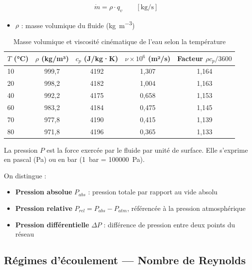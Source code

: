 \begin{definition}[title=Débit massique]
\begin{equation}
  \dot{m} = \rho \cdot q_v \qquad \left[\si{\kilogram\per\second}\right]
\end{equation}
\begin{itemize}
  \item $\rho$ : masse volumique du fluide (\si{\kilogram\per\cubic\metre})
\end{itemize}
\end{definition}

\begin{table}[H]
  \centering
  \caption{Masse volumique et viscosité cinématique de l'eau selon la température}
  \begin{tabular}{lcccc}
    \toprule
    $T$ (°C) & $\rho$ (kg/m³) & $c_p$ (J/kg·K) & $\nu \times 10^{6}$ (m²/s) & Facteur $\rho c_p / 3600$ \\
    \midrule
    10 & 999,7 & 4192 & 1,307 & 1,164 \\
    20 & 998,2 & 4182 & 1,004 & 1,163 \\
    40 & 992,2 & 4175 & 0,658 & 1,153 \\
    60 & 983,2 & 4184 & 0,475 & 1,145 \\
    70 & 977,8 & 4190 & 0,415 & 1,139 \\
    80 & 971,8 & 4196 & 0,365 & 1,133 \\
    \bottomrule
  \end{tabular}
\end{table}

\begin{definition}[title=Pression]
La pression $P$ est la force exercée par le fluide par unité de surface. Elle s'exprime en pascal (\si{\pascal}) ou en bar (\SI{1}{bar} = \SI{100000}{\pascal}).

On distingue :
\begin{itemize}
  \item \textbf{Pression absolue} $P_{abs}$ : pression totale par rapport au vide absolu
  \item \textbf{Pression relative} $P_{rel} = P_{abs} - P_{atm}$, référencée à la pression atmosphérique
  \item \textbf{Pression différentielle} $\Delta P$ : différence de pression entre deux points du réseau
\end{itemize}
\end{definition}

\subsection{Régimes d'écoulement — Nombre de Reynolds}

